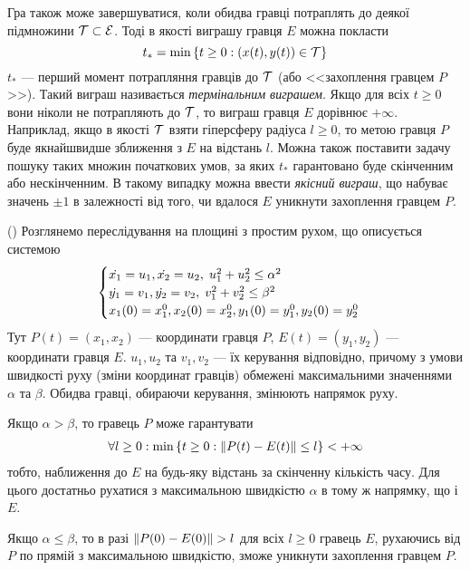 Гра також може завершуватися, коли обидва гравці потраплять до деякої підмножини $\mathcal{T} \subset \mathcal{E}$.
Тоді в якості виграшу гравця $E$ можна покласти
$$t_* = \min \left\{ t \geq 0 : (x(t), y(t)) \in \mathcal{T}\right\}$$
$t_*$ --- перший момент потрапляння гравців до $\mathcal{T}$ (або <<захоплення гравцем $P$>>).
Такий виграш називається \emph{термінальним виграшем}. Якщо для всіх $t \geq 0$ вони ніколи не потрапляють до $\mathcal{T}$,
то виграш гравця $E$ дорівнює $+\infty$. Наприклад, якщо в якості $\mathcal{T}$ взяти гіперсферу радіуса $l\geq 0$,
то метою гравця $P$ буде якнайшвидше зближення з $E$ на відстань $l$. Можна також поставити задачу пошуку
таких множин початкових умов, за яких $t_*$ гарантовано буде скінченним або нескінченним. 
В такому випадку можна ввести \emph{якісний виграш}, що набуває значень $\pm 1$ в залежності від того,
чи вдалося $E$ уникнути захоплення гравцем $P$.

\begin{example}(\cite{2})
    Розглянемо переслідування на площині з простим рухом, що описується системою
    \begin{gather*}
        \begin{cases}
            \dot{x_1} = u_1, \dot{x_2} = u_2, \; u_1^2 + u_2^2 \leq \alpha^2 \\
            \dot{y_1} = v_1, \dot{y_2} = v_2, \; v_1^2 + v_2^2 \leq \beta^2 \\
            x_1(0) = x_1^0, x_2(0) = x_2^0, y_1(0) = y_1^0, y_2(0) = y_2^0
        \end{cases}
    \end{gather*}
    Тут $P(t) = (x_1, x_2)$ --- координати гравця $P$, $E(t) = (y_1, y_2)$ --- координати гравця $E$.
    $u_1, u_2$ та $v_1, v_2$ --- їх керування відповідно, причому з умови швидкості руху (зміни координат гравців) обмежені
    максимальними значеннями $\alpha$ та $\beta$. Обидва гравці, обираючи керування, змінюють напрямок руху.
    
    Якщо $\alpha > \beta$, то гравець $P$ може гарантувати
    \begin{gather*}
        \forall l \geq 0 : \min \left\{ t \geq 0 : \Vert P(t) - E(t) \Vert \leq l\right\} < +\infty
    \end{gather*}
    тобто, наближення до $E$ на будь-яку відстань за скінченну кількість часу.
    Для цього достатньо рухатися з максимальною швидкістю $\alpha$ в тому ж напрямку, що і $E$.

    Якщо $\alpha \leq \beta$, то в разі $\Vert P(0) - E(0) \Vert > l$ для всіх $l \geq 0$ гравець $E$, рухаючись від $P$ по прямій з максимальною швидкістю,
    зможе уникнути захоплення гравцем $P$.
\end{example}

